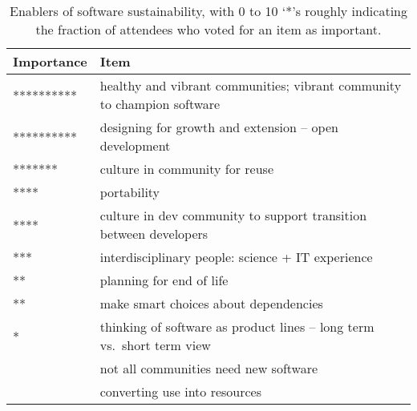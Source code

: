 \documentclass[11pt, oneside]{amsart}
\begin{document}
\begin{table*}[ht]
 \centering
\caption{Enablers of software sustainability, with 0 to 10 `*'s roughly
indicating the fraction of attendees who voted for an item as important.}
\label{tb:software_sustainability_enablers}
  \begin{scriptsize}
  \begin{tabular}{ | p{1.65cm} | p{10.0cm} |}
    \hline
  Importance & Item \\ \hline \hline
********** & healthy and vibrant communities; vibrant community to champion software \\ \hline
********** & designing for growth and extension -- open development \\ \hline
******* & culture in community for reuse \\ \hline
**** & portability \\ \hline
**** & culture in dev community to support transition between developers \\ \hline
*** & interdisciplinary people: science + IT experience \\ \hline
** & planning for end of life \\ \hline
** & make smart choices about dependencies \\ \hline
* & thinking of software as product lines -- long term vs.~short term view \\ \hline
 & not all communities need new software \\ \hline
 & converting use into resources \\ \hline
    \end{tabular}
    \end{scriptsize}
\end{table*} 
\end{document}
